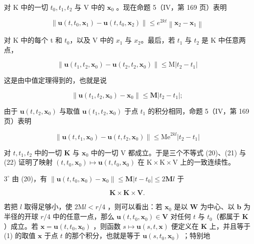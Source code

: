 对 K 中的一切 \(t_0, t_1, t_2\) 与 V 中的 \(\mathbf{x}_0\) 。现在命题 5（IV，第 169 页）表明

\[
\left\| \mathbf {u} (t, t _ {0}, \mathbf {x} _ {1}) - \mathbf {u} (t, t _ {0}, \mathbf {x} _ {2}) \right\| \leqslant e ^ {2 k t} \left\| \mathbf {x} _ {2} - \mathbf {x} _ {1} \right\|\tag{21}
\]

对 K 中的每个 t 和 \(t_{0}\)，以及 V 中的 \(x_{1}\) 与 \(x_{2}\)。最后，若 \(t_{1}\) 与 \(t_{2}\) 是 K 中任意两点，

\[
\left\| \mathbf {u} \left(t _ {1}, t _ {2}, \mathbf {x} _ {0}\right) - \mathbf {u} \left(t _ {2}, t _ {2}, \mathbf {x} _ {0}\right) \right\| \leqslant \mathrm{M} \left| t _ {2} - t _ {1} \right|
\]

这是由中值定理得到的，也就是说

\[
\left\| \mathbf {u} (t _ {1}, t _ {2}, \mathbf {x} _ {0}) - \mathbf {x} _ {0} \right\| \leqslant \mathbf {M} \left| t _ {2} - t _ {1} \right|;
\]

由于 \(\mathbf{u}(t, t_2, \mathbf{x}_0)\) 与取值 \(\mathbf{u}(t_1, t_2, \mathbf{x}_0)\) 于点 \(t_1\) 的积分相同，命题 5（IV，第 169 页）表明

\[
\left\| \mathbf {u} (t, t _ {1}, \mathbf {x} _ {0}) - \mathbf {u} (t, t _ {2}, \mathbf {x} _ {0}) \right\| \leqslant \mathrm{Me} ^ {2 k l} | t _ {2} - t _ {1} |\tag{22}
\]

对 \(t, t_{1}, t_{2}\) 中的一切 \(\mathbf{K}\) 与 \(\mathbf{x}_{0}\) 中的一切 \(\mathrm{V}\) 都成立。于是三个不等式 (20)、(21) 与 (22) 证明了映射 \((t, t_{0}, \mathbf{x}_{0}) \mapsto \mathbf{u}(t, t_{0}, \mathbf{x}_{0})\) 在 \(\mathrm{K} \times \mathrm{K} \times \mathrm{V}\) 上的一致连续性。

\(3^{\circ}\) 由 (20)，有 \(\|\mathbf{u}(t, t_{0}, \mathbf{x}_{0}) - \mathbf{x}_{0}\| \leqslant \mathbf{M} |t - t_{0}| \leqslant 2\mathbf{M}l\) 于

\[
\mathbf {K} \times \mathbf {K} \times \mathbf {V}.
\]

若把 \(l\) 取得足够小，使 \(2\mathrm{M}l < r / 4\) ，则可以看出：若 \(\mathbf{x}_0\) 是以 \(\mathbf{W}\) 为中心、以 \(\mathbf{b}\) 为半径的开球 \(r / 4\) 中的任意一点，那么 \(\mathbf{u}(t,t_0,\mathbf{x}_0)\in \mathbf{V}\) 对任何 \(t\) 与 \(t_0\)（都属于 \(\mathbf{K}\) ）成立。若 \(\mathbf{x} = \mathbf{u}(t,t_0,\mathbf{x}_0)\) ，则函数 \(s\mapsto \mathbf{u}(s,t,\mathbf{x})\) 便定义在 \(\mathbf{K}\) 上，并且等于 (1) 的取值 \(\mathbf{x}\) 于点 \(t\) 的那个积分，也就是等于 \(\mathbf{u}(s,t_0,\mathbf{x}_0)\) ；特别地

